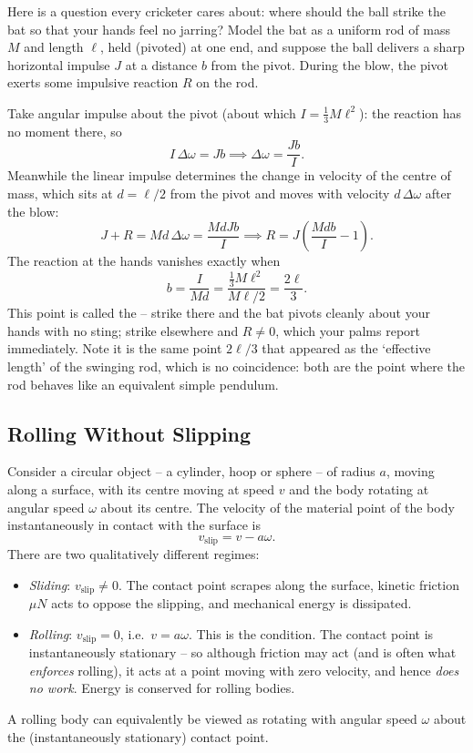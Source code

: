 \documentclass[a4paper]{scrartcl}
\begin{document}
\begin{example}
	Here is a question every cricketer cares about: where should the ball strike the bat so that your hands feel no jarring? Model the bat as a uniform rod of mass $M$ and length $\ell$, held (pivoted) at one end, and suppose the ball delivers a sharp horizontal impulse $J$ at a distance $b$ from the pivot. During the blow, the pivot exerts some impulsive reaction $R$ on the rod.

	Take angular impulse about the pivot (about which $I = \frac{1}{3}M\ell^2$): the reaction has no moment there, so
	$$
	I\, \Delta\omega = J b \implies \Delta \omega = \frac{Jb}{I}.
	$$
	Meanwhile the linear impulse determines the change in velocity of the centre of mass, which sits at $d = \ell/2$ from the pivot and moves with velocity $d\,\Delta\omega$ after the blow:
	$$
	J + R = M d\, \Delta\omega = \frac{MdJb}{I} \implies R = J\left(\frac{Mdb}{I} - 1\right).
	$$
	The reaction at the hands vanishes exactly when
	$$
	b = \frac{I}{Md} = \frac{\frac{1}{3}M\ell^2}{M \ell/2} = \frac{2\ell}{3}.
	$$
	This point is called the  -- strike there and the bat pivots cleanly about your hands with no sting; strike elsewhere and $R \neq 0$, which your palms report immediately. Note it is the same point $2\ell/3$ that appeared as the `effective length' of the swinging rod, which is no coincidence: both are the point where the rod behaves like an equivalent simple pendulum.
\end{example}

\subsection{Rolling Without Slipping}

Consider a circular object -- a cylinder, hoop or sphere -- of radius $a$, moving along a surface, with its centre moving at speed $v$ and the body rotating at angular speed $\omega$ about its centre. The velocity of the material point of the body instantaneously in contact with the surface is
$$
v_{\text{slip}} = v - a\omega.
$$
There are two qualitatively different regimes:
\begin{itemize}
	\item \emph{Sliding}: $v_{\text{slip}} \neq 0$. The contact point scrapes along the surface, kinetic friction $\mu N$ acts to oppose the slipping, and mechanical energy is dissipated.
	\item \emph{Rolling}: $v_{\text{slip}} = 0$, i.e.\ $v = a\omega$. This is the  condition. The contact point is instantaneously stationary -- so although friction may act (and is often what \emph{enforces} rolling), it acts at a point moving with zero velocity, and hence \emph{does no work}. Energy is conserved for rolling bodies.
\end{itemize}
A rolling body can equivalently be viewed as rotating with angular speed $\omega$ about the (instantaneously stationary) contact point.
\end{document}

